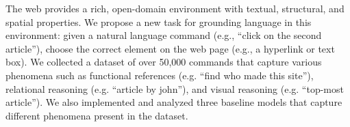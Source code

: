 The web provides a rich, open-domain environment with textual, structural, and spatial properties. We propose a new task for grounding language in this environment: given a natural language command (e.g., ``click on the second article''), choose the correct element on the web page (e.g., a hyperlink or text box). We collected a dataset of over 50,000 commands that capture various phenomena such as functional references (e.g. ``find who made this site''), relational reasoning (e.g. ``article by john''), and visual reasoning (e.g. ``top-most article''). We also implemented and analyzed three baseline models that capture different phenomena present in the dataset.

